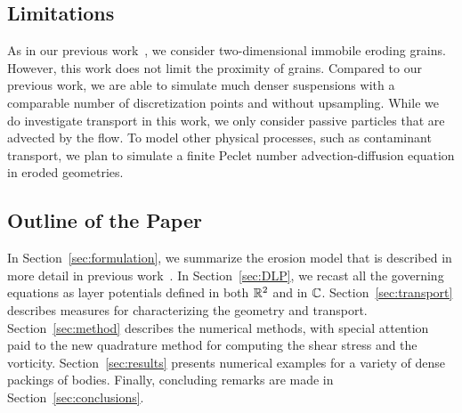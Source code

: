 \documentclass{jfm}
\begin{document}
\subsection{Limitations}
As in our previous work~\citep{qua-moo2018}, we consider two-dimensional
immobile eroding grains. However, this work does not limit the proximity
of  grains. Compared to our previous work, we are able to simulate much
denser suspensions with a comparable number of discretization points and
without upsampling.  While we do investigate transport in this work, we
only consider passive particles that are advected by the flow.  To model
other physical processes, such as contaminant transport, we plan to
simulate a finite Peclet number advection-diffusion equation in eroded
geometries.

\subsection{Outline of the Paper}
In Section~\ref{sec:formulation}, we summarize the erosion model that is
described in more detail in previous work~\citep{qua-moo2018}.  In
Section~\ref{sec:DLP}, we recast all the governing equations as layer
potentials defined in both ${\mathbb{R}}^2$ and in ${\mathbb{C}}$.
Section~\ref{sec:transport} describes measures for characterizing the
geometry and transport. Section~\ref{sec:method} describes the numerical
methods, with special attention paid to the new quadrature method for
computing the shear stress and the vorticity.  Section~\ref{sec:results}
presents numerical examples for a variety of dense packings of bodies.
Finally, concluding remarks are made in Section~\ref{sec:conclusions}.

\end{document}
